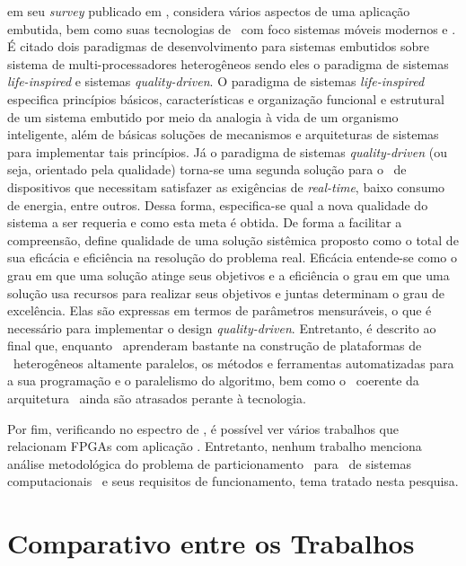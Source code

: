    \citeauthor{Jozwiak2017} em seu \textit{survey} publicado em \citeyear{Jozwiak2017}, considera vários aspectos de uma aplicação embutida, bem como suas tecnologias de \design\ com foco sistemas móveis modernos e \wearables.
   É citado dois paradigmas de desenvolvimento para sistemas embutidos sobre sistema de multi-processadores heterogêneos sendo eles o paradigma de sistemas \textit{life-inspired} e sistemas \textit{quality-driven}. 
   O paradigma de sistemas \textit{life-inspired} especifica princípios básicos, características e organização funcional e estrutural de um sistema embutido por meio da analogia à vida de um organismo inteligente, além de básicas soluções de mecanismos e arquiteturas de sistemas para implementar tais princípios. 
   Já o paradigma de sistemas \textit{quality-driven} (ou seja, orientado pela qualidade) torna-se uma segunda solução para o \design\ de dispositivos que necessitam satisfazer as exigências de \textit{real-time}, baixo consumo de energia, entre outros. 
   Dessa forma, especifica-se qual a nova qualidade do sistema a ser requeria e como esta meta é obtida. 
   De forma a facilitar a compreensão, \citeauthor{Jozwiak2017} define qualidade de uma solução sistêmica proposto como o total de sua eficácia e eficiência na resolução do problema real. 
   Eficácia entende-se como o grau em que uma solução atinge seus objetivos e a eficiência o grau em que uma solução usa recursos para realizar seus objetivos e juntas determinam o grau de excelência. 
   Elas são expressas em termos de parâmetros mensuráveis, o que é necessário para implementar o design \textit{quality-driven}.
   Entretanto, é descrito ao final que, enquanto \designers\ aprenderam bastante na construção de plataformas de \hardware\ heterogêneos altamente paralelos, os métodos e ferramentas automatizadas para a sua programação e o paralelismo do algoritmo, bem como o \codesign\ coerente da arquitetura \hs\ ainda são atrasados perante à tecnologia.
      
   Por fim, verificando no espectro de \wearables, é possível ver vários trabalhos \citep{Plessl2003, Ahola2007, Abdelhedi2016, Narumi2016, Lee2015} que relacionam FPGAs com aplicação \wearable.
   Entretanto, nenhum trabalho menciona análise metodológica do problema de particionamento \hs\ para \design\ de sistemas computacionais \wearables\ e seus requisitos de funcionamento, tema tratado nesta pesquisa.


   \section{Comparativo entre os Trabalhos}      

